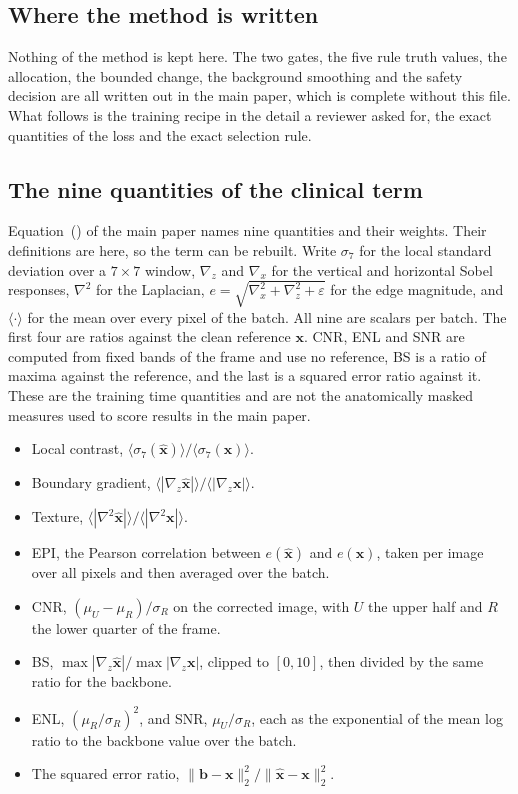 \subsection{Where the method is written}
\label{sec:supp_forward}
Nothing of the method is kept here. The two gates, the five rule truth values, the allocation, the
bounded change, the background smoothing and the safety decision are all written out in the main
paper, which is complete without this file. What follows is the training recipe in the detail a
reviewer asked for, the exact quantities of the loss and the exact selection rule.

\subsection{The nine quantities of the clinical term}
\label{sec:supp_clinical_terms}
Equation~(\EqLossClin) of the main paper names nine quantities and their weights. Their definitions
are here, so the term can be rebuilt. Write $\sigma_7$ for the local standard deviation over a
$7 \times 7$ window, $\nabla_z$ and $\nabla_x$ for the vertical and horizontal Sobel responses,
$\nabla^2$ for the Laplacian, $e = \sqrt{\nabla_x^2 + \nabla_z^2 + \varepsilon}$ for the edge
magnitude, and $\langle \cdot \rangle$ for the mean over every pixel of the batch. All nine are scalars
per batch. The first four are ratios against the clean reference $\mathbf{x}$. CNR, ENL and SNR are
computed from fixed bands of the frame and use no reference, BS is a ratio of maxima against the
reference, and the last is a squared error ratio against it. These are the training time quantities
and are not the anatomically masked measures used to score results in the main paper.
\begin{itemize}\itemsep1pt
\item Local contrast, $\langle \sigma_7(\hat{\mathbf{x}}) \rangle / \langle \sigma_7(\mathbf{x}) \rangle$.
\item Boundary gradient, $\langle |\nabla_z \hat{\mathbf{x}}| \rangle / \langle |\nabla_z \mathbf{x}| \rangle$.
\item Texture, $\langle |\nabla^2 \hat{\mathbf{x}}| \rangle / \langle |\nabla^2 \mathbf{x}| \rangle$.
\item EPI, the Pearson correlation between $e(\hat{\mathbf{x}})$ and $e(\mathbf{x})$, taken per image
over all pixels and then averaged over the batch.
\item CNR, $(\mu_U - \mu_R) / \sigma_R$ on the corrected image, with $U$ the upper half and $R$ the
lower quarter of the frame.
\item BS, $\max |\nabla_z \hat{\mathbf{x}}| / \max |\nabla_z \mathbf{x}|$, clipped to $[0,10]$, then
divided by the same ratio for the backbone.
\item ENL, $(\mu_R / \sigma_R)^2$, and SNR, $\mu_U / \sigma_R$, each as the exponential of the mean
log ratio to the backbone value over the batch.
\item The squared error ratio, $\lVert \mathbf{b} - \mathbf{x} \rVert_2^2 / \lVert \hat{\mathbf{x}} - \mathbf{x} \rVert_2^2$.
\end{itemize}

